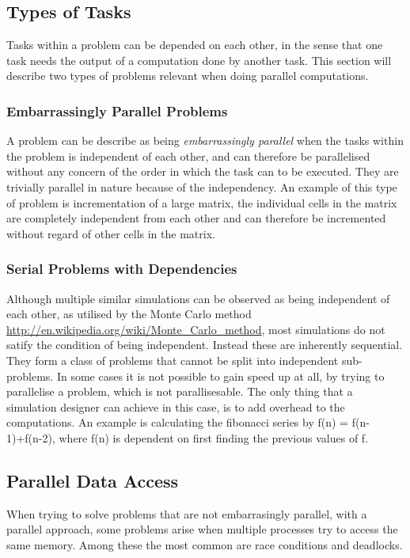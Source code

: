 \subsection{Types of Tasks}\label{top}

Tasks within a problem can be depended on each other, in the sense that one task needs the output of a computation done by another task. This section will describe two types of problems relevant when doing parallel computations.

\subsubsection{Embarrassingly Parallel Problems}
A problem can be describe as being \emph{embarrassingly parallel} when the tasks within the problem is independent of each other, and can therefore be parallelised without any concern of the order in which the task can to be executed. They are trivially parallel in nature because of the independency. An example of this type of problem is incrementation of a large matrix, the individual cells in the matrix are completely independent from each other and can therefore be incremented without regard of other cells in the matrix.

\subsubsection{Serial Problems with Dependencies}
Although multiple similar simulations can be observed as being independent of each other, as utilised by the Monte Carlo method \url{http://en.wikipedia.org/wiki/Monte_Carlo_method}, most simulations do not satify the condition of being independent. Instead these are inherently sequential. They form a class of problems that cannot be split into independent sub-problems. In some cases it is not possible to gain speed up at all, by trying to parallelise a problem, which is not parallisesable. The only thing that a simulation designer can achieve in this case, is to add overhead to the computations. An example is calculating the fibonacci series by f(n) = f(n-1)+f(n-2), where f(n) is dependent on first finding the previous values of f.

\subsection{Parallel Data Access}
When trying to solve problems that are not embarrasingly parallel, with a parallel approach, some problems arise when multiple processes try to access the same memory. Among these the most common are race conditions and deadlocks.

